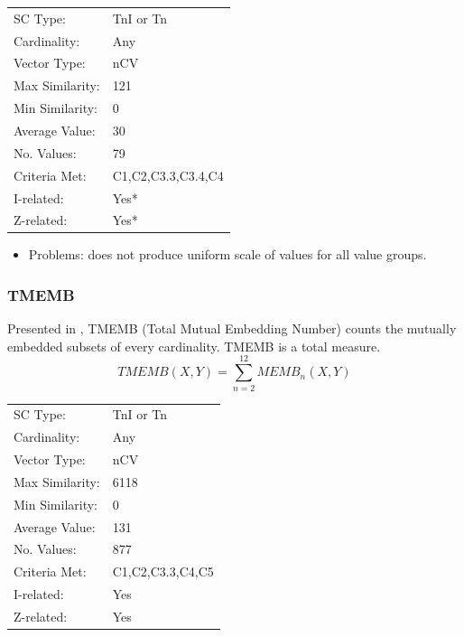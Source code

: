 \documentclass{article}
\begin{document}
\begin{center}
\begin{tabular}{ll}
 SC Type:         &  TnI or Tn           \\
 Cardinality:     &  Any                 \\
 Vector Type:     &  nCV                 \\
 Max Similarity:  &  121                 \\
 Min Similarity:  &  0                   \\
 Average Value:   &  30                  \\
 No. Values:      &  79                  \\
 Criteria Met:    &  C1,C2,C3.3,C3.4,C4  \\
 I-related:       &  Yes*                \\
 Z-related:       &  Yes*                \\
\end{tabular}
\end{center}


\begin{itemize}
\item Problems: does not produce uniform scale of values for all value
  groups.
\end{itemize}
\subsubsection{TMEMB}
\label{sec-13-5-3}

Presented in \citet[pp. 492]{Rahn1979}, TMEMB (Total Mutual Embedding
Number) counts the mutually embedded subsets of every
cardinality. TMEMB is a total measure.
$$TMEMB\left(X,Y\right)=\sum_{n=2}^{12}MEMB_{n}\left(X,Y\right)$$

\begin{center}
\begin{tabular}{ll}
 SC Type:         &  TnI or Tn         \\
 Cardinality:     &  Any               \\
 Vector Type:     &  nCV               \\
 Max Similarity:  &  6118              \\
 Min Similarity:  &  0                 \\
 Average Value:   &  131               \\
 No. Values:      &  877               \\
 Criteria Met:    &  C1,C2,C3.3,C4,C5  \\
 I-related:       &  Yes               \\
 Z-related:       &  Yes               \\
\end{tabular}
\end{center}
\end{document}
